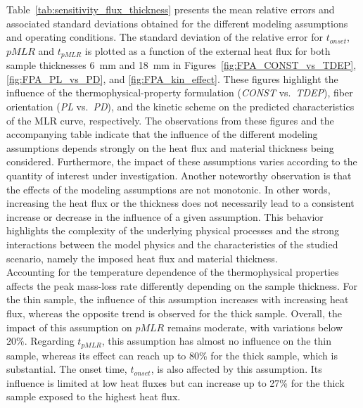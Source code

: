 \documentclass{article}
\begin{document}
Table~\ref{tab:sensitivity_flux_thickness} presents the mean relative errors and associated standard deviations obtained for the different modeling assumptions and operating conditions. The standard deviation of the relative error for $t_{onset}$, $pMLR$ and $t_{pMLR}$ is plotted as a function of the external heat flux for both sample thicknesses 6~mm and 18~mm in Figures~\ref{fig:FPA_CONST_vs_TDEP}, \ref{fig:FPA_PL_vs_PD}, and \ref{fig:FPA_kin_effect}. These figures highlight the influence of the thermophysical-property formulation (\textit{CONST} vs.\ \textit{TDEP}), fiber orientation (\textit{PL} vs.\ \textit{PD}), and the kinetic scheme on the predicted characteristics of the MLR curve, respectively. The observations from these figures and the accompanying table indicate that the influence of the different modeling assumptions depends strongly on the heat flux and material thickness being considered. Furthermore, the impact of these assumptions varies according to the quantity of interest under investigation. Another noteworthy observation is that the effects of the modeling assumptions are not monotonic. In other words, increasing the heat flux or the thickness does not necessarily lead to a consistent increase or decrease in the influence of a given assumption. This behavior highlights the complexity of the underlying physical processes and the strong interactions between the model physics and the characteristics of the studied scenario, namely the imposed heat flux and material thickness.\\

Accounting for the temperature dependence of the thermophysical properties affects the peak mass-loss rate differently depending on the sample thickness. For the thin sample, the influence of this assumption increases with increasing heat flux, whereas the opposite trend is observed for the thick sample. Overall, the impact of this assumption on $pMLR$ remains moderate, with variations below 20\%. Regarding $t_{pMLR}$, this assumption has almost no influence on the thin sample, whereas its effect can reach up to 80\% for the thick sample, which is substantial. The onset time, $t_{onset}$, is also affected by this assumption. Its influence is limited at low heat fluxes but can increase up to 27\% for the thick sample exposed to the highest heat flux.\\
\end{document}
